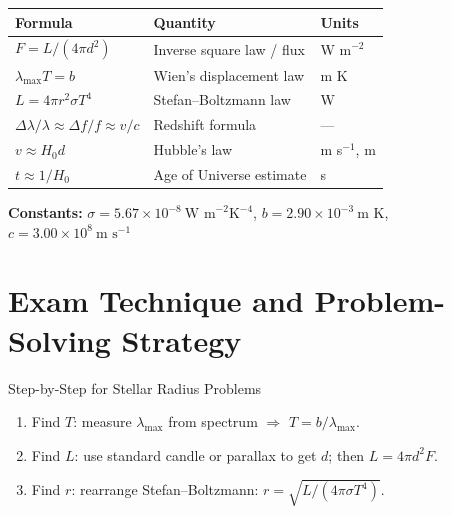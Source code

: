\begin{minipage}{\linewidth}
\begin{tcolorbox}[colback=lightgold, colframe=accentgold]
\renewcommand{\arraystretch}{1.8}
\begin{tabular}{@{}lll@{}}
\toprule
\textbf{Formula} & \textbf{Quantity} & \textbf{Units} \\
\midrule
$F = L/(4\pi d^2)$ & Inverse square law / flux & W m$^{-2}$ \\
$\lambda_{\max} T = b$ & Wien's displacement law & m K \\
$L = 4\pi r^2\sigma T^4$ & Stefan--Boltzmann law & W \\
$\Delta\lambda/\lambda \approx \Delta f/f \approx v/c$ & Redshift formula & --- \\
$v \approx H_0 d$ & Hubble's law & m s$^{-1}$, m \\
$t \approx 1/H_0$ & Age of Universe estimate & s \\
\bottomrule
\end{tabular}
\end{tcolorbox}

\vspace{0.5em}
\begin{tcolorbox}[colback=lightblue, colframe=darkblue]
\textbf{Constants:}\quad
$\sigma = 5.67\times10^{-8}\ \text{W m}^{-2}\text{K}^{-4}$,\quad
$b = 2.90\times10^{-3}\ \text{m K}$,\quad
$c = 3.00\times10^{8}\ \text{m s}^{-1}$
\end{tcolorbox}
\end{minipage}

\section{Exam Technique and Problem-Solving Strategy}

\begin{keybox}{Step-by-Step for Stellar Radius Problems}
\begin{enumerate}[itemsep=3pt]
  \item Find $T$: measure $\lambda_{\max}$ from spectrum $\Rightarrow$ $T = b/\lambda_{\max}$.
  \item Find $L$: use standard candle or parallax to get $d$; then $L = 4\pi d^2 F$.
  \item Find $r$: rearrange Stefan--Boltzmann: $r = \sqrt{L/(4\pi\sigma T^4)}$.
\end{enumerate}
\end{keybox}

